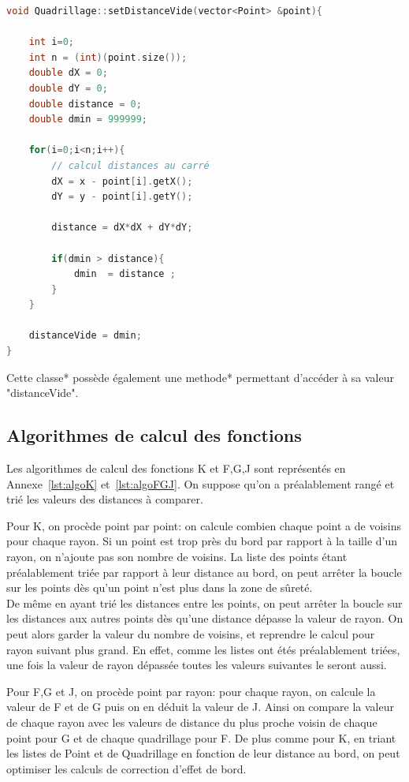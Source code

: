 \documentclass[stage2a]{tnreport}
\begin{document}
\begin{lstlisting}[language=C++, caption={Méthode trouvant le point le plus proche d'une maille du Quadrillage}, label={lst:setDistanceVide}]
void Quadrillage::setDistanceVide(vector<Point> &point){
	
	int i=0;
	int n = (int)(point.size());
	double dX = 0;
	double dY = 0;
	double distance = 0;
	double dmin = 999999;

	for(i=0;i<n;i++){
		// calcul distances au carré
		dX = x - point[i].getX();
		dY = y - point[i].getY();

		distance = dX*dX + dY*dY;

		if(dmin > distance){
			dmin  = distance ;
		}
	}

	distanceVide = dmin;
}
\end{lstlisting}

Cette \gls{classe}* possède également une \gls{methode}* permettant d'accéder à sa valeur "distanceVide".

\subsection{Algorithmes de calcul des fonctions}
Les algorithmes de calcul des fonctions K et F,G,J sont représentés en Annexe~\ref{lst:algoK} et~\ref{lst:algoFGJ}. On suppose qu'on a préalablement rangé et trié les valeurs des distances à comparer.

Pour K, on procède point par point: on calcule combien chaque point a de voisins pour chaque rayon. Si un point est trop près du bord par rapport à la taille d'un rayon, on n'ajoute pas son nombre de voisins. La liste des points étant préalablement triée par rapport à leur distance au bord, on peut arrêter la boucle sur les points dès qu'un point n'est plus dans la zone de sûreté.\\
De même en ayant trié les distances entre les points, on peut arrêter la boucle sur les distances aux autres points dès qu'une distance dépasse la valeur de rayon. On peut alors garder la valeur du nombre de voisins, et reprendre le calcul pour rayon suivant plus grand.
En effet, comme les listes ont étés préalablement triées, une fois la valeur de rayon dépassée toutes les valeurs suivantes le seront aussi.

Pour F,G et J, on procède point par rayon: pour chaque rayon, on calcule la valeur de F et de G puis on en déduit la valeur de J. Ainsi on compare la valeur de chaque rayon avec les valeurs de distance du plus proche voisin de chaque point pour G et de chaque quadrillage pour F. De plus comme pour K, en triant les listes de Point et de Quadrillage en fonction de leur distance au bord, on peut optimiser les calculs de correction d'effet de bord.
\end{document}
